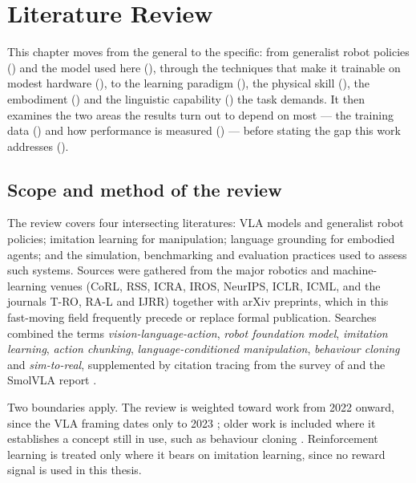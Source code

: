 \chapter{Literature Review}
\label{chap:background}

This chapter moves from the general to the specific: from generalist robot policies
() and the model used here (), through the
techniques that make it trainable on modest hardware (), to
the learning paradigm (), the physical skill
(), the embodiment () and the linguistic
capability () the task demands. It then examines the two areas the
results turn out to depend on most --- the training data () and how
performance is measured () --- before stating the gap this work
addresses ().

\section{Scope and method of the review}
\label{sec:bg-scope}
The review covers four intersecting literatures: VLA models and generalist robot
policies; imitation learning for manipulation; language grounding for embodied agents;
and the simulation, benchmarking and evaluation practices used to assess such systems.
Sources were gathered from the major robotics and machine-learning venues (CoRL, RSS,
ICRA, IROS, NeurIPS, ICLR, ICML, and the journals T-RO, RA-L and IJRR) together with
arXiv preprints, which in this fast-moving field frequently precede or replace formal
publication. Searches combined the terms \emph{vision-language-action}, \emph{robot
foundation model}, \emph{imitation learning}, \emph{action chunking},
\emph{language-conditioned manipulation}, \emph{behaviour cloning} and
\emph{sim-to-real}, supplemented by citation tracing from the survey of
\textcite{sapkota2026vla} and the SmolVLA report \parencite{shukor2025smolvla}.

Two boundaries apply. The review is weighted toward work from 2022 onward, since the
VLA framing dates only to 2023 \parencite{zitkovich2023rt2}; older work is included
where it establishes a concept still in use, such as behaviour cloning
\parencite{pomerleau1988alvinn}. Reinforcement learning is treated only where it bears
on imitation learning, since no reward signal is used in this thesis.

